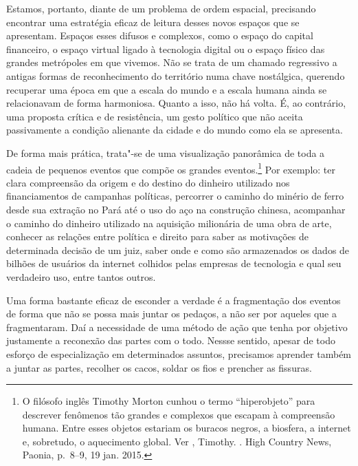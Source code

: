Estamos, portanto, diante de um problema de ordem espacial, precisando encontrar uma estratégia eficaz de leitura desses novos espaços que se apresentam. Espaços esses difusos e complexos, como o espaço do capital financeiro, o espaço virtual ligado à tecnologia digital ou o espaço físico das grandes metrópoles em que vivemos. Não se trata de um chamado regressivo
a antigas formas de reconhecimento do território numa chave nostálgica,
querendo recuperar uma época em que a escala do mundo e a escala humana
ainda se relacionavam de forma harmoniosa. Quanto a isso, não há volta.
É, ao contrário, uma proposta crítica e de resistência, um gesto
político que não aceita passivamente a condição alienante da cidade e do
mundo como ela se apresenta.

De forma mais prática, trata"-se de uma visualização panorâmica de toda a cadeia de pequenos eventos que compõe os grandes eventos.\footnote{O filósofo inglês Timothy Morton cunhou o termo ``hiperobjeto'' para descrever fenômenos tão grandes e complexos que escapam à compreensão humana. Entre esses objetos estariam os buracos negros, a biosfera, a internet e, sobretudo, o aquecimento global. Ver , Timothy. {}. High Country News, Paonia, p.~8--9, 19 jan. 2015.} Por exemplo: ter clara compreensão da origem e do destino do dinheiro utilizado nos financiamentos de campanhas políticas, percorrer o caminho do minério de ferro desde sua extração no Pará até o uso do aço na construção chinesa, acompanhar o caminho do dinheiro utilizado na aquisição milionária de uma obra de arte, conhecer as relações entre política e direito para saber as motivações de determinada decisão de um juiz, saber onde e como são armazenados os dados de bilhões de usuários da internet colhidos pelas empresas de tecnologia e qual seu verdadeiro uso, entre tantos outros.

Uma forma bastante eficaz de esconder a verdade é a fragmentação dos eventos de forma que não se possa mais juntar os pedaços, a não ser por aqueles que a fragmentaram. Daí a necessidade de uma método de ação que tenha por objetivo justamente a reconexão das partes com o todo. Nessse sentido, apesar de todo esforço de especialização em determinados assuntos, precisamos aprender também a juntar as partes, recolher os cacos, soldar os fios e prencher as fissuras.

